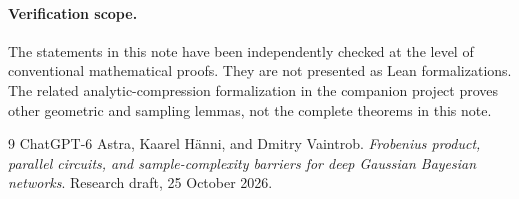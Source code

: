 \documentclass[11pt]{article}
\theoremstyle{remark}\newtheorem{remark}[theorem]{Remark}
\begin{document}
\paragraph{Verification scope.}
The statements in this note have been independently checked at the level
of conventional mathematical proofs. They are not presented as Lean
formalizations. The related analytic-compression formalization in the
companion project proves other geometric and sampling lemmas, not the
complete theorems in this note.

\begin{thebibliography}{9}
ChatGPT-6 Astra, Kaarel H\"anni, and Dmitry Vaintrob.
\emph{Frobenius product, parallel circuits, and sample-complexity barriers
for deep Gaussian Bayesian networks}. Research draft, 25 October 2026.
\end{thebibliography}
\end{document}
